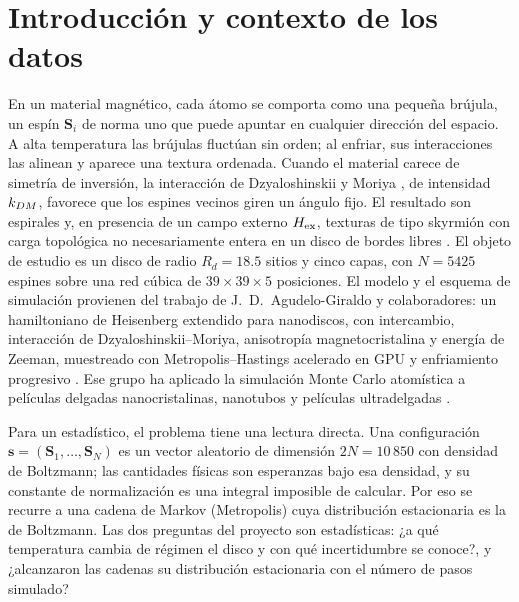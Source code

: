 \section{Introducción y contexto de los datos}

En un material magnético, cada átomo se comporta como una pequeña brújula, un espín $\mathbf S_i$ de norma uno que puede apuntar en cualquier dirección del espacio. A alta temperatura las brújulas fluctúan sin orden; al enfriar, sus interacciones las alinean y aparece una textura ordenada. Cuando el material carece de simetría de inversión, la interacción de Dzyaloshinskii y Moriya \citep{dzyaloshinskii1958,moriya1960}, de intensidad $k_{DM}$, favorece que los espines vecinos giren un ángulo fijo. El resultado son espirales y, en presencia de un campo externo $H_{\mathrm{ex}}$, texturas de tipo skyrmión con carga topológica no necesariamente entera en un disco de bordes libres \citep{nagaosa2013}. El objeto de estudio es un disco de radio $R_d=18.5$ sitios y cinco capas, con $N=5425$ espines sobre una red cúbica de $39\times39\times5$ posiciones. El modelo y el esquema de simulación provienen del trabajo de J.~D.~Agudelo-Giraldo y colaboradores: un hamiltoniano de Heisenberg extendido para nanodiscos, con intercambio, interacción de Dzyaloshinskii--Moriya, anisotropía magnetocristalina y energía de Zeeman, muestreado con Metropolis--Hastings acelerado en GPU y enfriamiento progresivo \citep{mendezrondon2026}. Ese grupo ha aplicado la simulación Monte Carlo atomística a películas delgadas nanocristalinas, nanotubos y películas ultradelgadas \citep{agudelo2016,agudelo2017,agudelo2020,agudelo2023}.

Para un estadístico, el problema tiene una lectura directa. Una configuración $\mathbf s=(\mathbf S_1,\dots,\mathbf S_N)$ es un vector aleatorio de dimensión $2N=10\,850$ con densidad de Boltzmann; las cantidades físicas son esperanzas bajo esa densidad, y su constante de normalización es una integral imposible de calcular. Por eso se recurre a una cadena de Markov (Metropolis) cuya distribución estacionaria es la de Boltzmann. Las dos preguntas del proyecto son estadísticas: ¿a qué temperatura cambia de régimen el disco y con qué incertidumbre se conoce?, y ¿alcanzaron las cadenas su distribución estacionaria con el número de pasos simulado?

